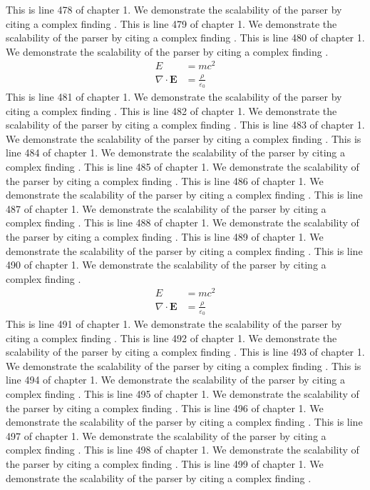 This is line 478 of chapter 1. We demonstrate the scalability of the parser by citing a complex finding \cite{ref1_478}.
This is line 479 of chapter 1. We demonstrate the scalability of the parser by citing a complex finding \cite{ref1_479}.
This is line 480 of chapter 1. We demonstrate the scalability of the parser by citing a complex finding \cite{ref1_480}.
\begin{align*}
  E &= mc^2 \\
  \nabla \cdot \mathbf{E} &= \frac{\rho}{\varepsilon_0}
\end{align*}
This is line 481 of chapter 1. We demonstrate the scalability of the parser by citing a complex finding \cite{ref1_481}.
This is line 482 of chapter 1. We demonstrate the scalability of the parser by citing a complex finding \cite{ref1_482}.
This is line 483 of chapter 1. We demonstrate the scalability of the parser by citing a complex finding \cite{ref1_483}.
This is line 484 of chapter 1. We demonstrate the scalability of the parser by citing a complex finding \cite{ref1_484}.
This is line 485 of chapter 1. We demonstrate the scalability of the parser by citing a complex finding \cite{ref1_485}.
This is line 486 of chapter 1. We demonstrate the scalability of the parser by citing a complex finding \cite{ref1_486}.
This is line 487 of chapter 1. We demonstrate the scalability of the parser by citing a complex finding \cite{ref1_487}.
This is line 488 of chapter 1. We demonstrate the scalability of the parser by citing a complex finding \cite{ref1_488}.
This is line 489 of chapter 1. We demonstrate the scalability of the parser by citing a complex finding \cite{ref1_489}.
This is line 490 of chapter 1. We demonstrate the scalability of the parser by citing a complex finding \cite{ref1_490}.
\begin{align*}
  E &= mc^2 \\
  \nabla \cdot \mathbf{E} &= \frac{\rho}{\varepsilon_0}
\end{align*}
This is line 491 of chapter 1. We demonstrate the scalability of the parser by citing a complex finding \cite{ref1_491}.
This is line 492 of chapter 1. We demonstrate the scalability of the parser by citing a complex finding \cite{ref1_492}.
This is line 493 of chapter 1. We demonstrate the scalability of the parser by citing a complex finding \cite{ref1_493}.
This is line 494 of chapter 1. We demonstrate the scalability of the parser by citing a complex finding \cite{ref1_494}.
This is line 495 of chapter 1. We demonstrate the scalability of the parser by citing a complex finding \cite{ref1_495}.
This is line 496 of chapter 1. We demonstrate the scalability of the parser by citing a complex finding \cite{ref1_496}.
This is line 497 of chapter 1. We demonstrate the scalability of the parser by citing a complex finding \cite{ref1_497}.
This is line 498 of chapter 1. We demonstrate the scalability of the parser by citing a complex finding \cite{ref1_498}.
This is line 499 of chapter 1. We demonstrate the scalability of the parser by citing a complex finding \cite{ref1_499}.
